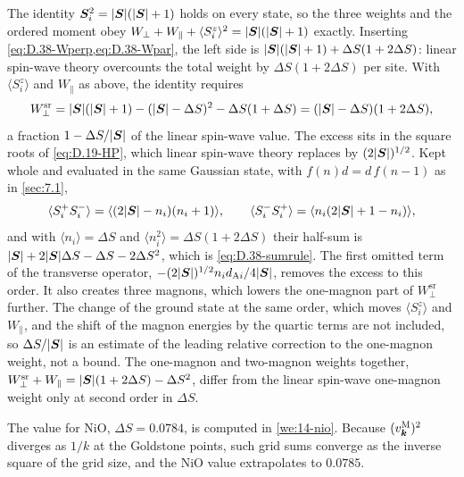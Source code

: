 The identity $\bm{S}_i^2 = |\bm{S}|(|\bm{S}| + 1)$ holds on every state, so the three weights and the ordered moment obey $W_\perp + W_\parallel + \langle S^z_i\rangle^2 = |\bm{S}|(|\bm{S}| + 1)$ exactly. Inserting \cref{eq:D.38-Wperp,eq:D.38-Wpar}, the left side is $|\bm{S}|(|\bm{S}| + 1) + \Delta S(1 + 2\Delta S)$: linear spin-wave theory overcounts the total weight by $\Delta S(1 + 2\Delta S)$ per site. With $\langle S^z_i\rangle$ and $W_\parallel$ as above, the identity requires
\begin{equation}
  W_\perp^{\mathrm{sr}} = |\bm{S}|(|\bm{S}| + 1) - (|\bm{S}| - \Delta S)^2 - \Delta S(1 + \Delta S) = (|\bm{S}| - \Delta S)(1 + 2\Delta S) ,
  \label{eq:D.38-sumrule}
\end{equation}
a fraction $1 - \Delta S/|\bm{S}|$ of the linear spin-wave value. The excess sits in the square roots of \cref{eq:D.19-HP}, which linear spin-wave theory replaces by $(2|\bm{S}|)^{1/2}$. Kept whole and evaluated in the same Gaussian state, with $f(n)d = d\,f(n - 1)$ as in \cref{sec:7.1},
\begin{equation*}
  \langle S^+_iS^-_i\rangle = \langle(2|\bm{S}| - n_i)(n_i + 1)\rangle, \qquad \langle S^-_iS^+_i\rangle = \langle n_i(2|\bm{S}| + 1 - n_i)\rangle ,
\end{equation*}
and with $\langle n_i\rangle = \Delta S$ and $\langle n_i^2\rangle = \Delta S(1 + 2\Delta S)$ their half-sum is $|\bm{S}| + 2|\bm{S}|\Delta S - \Delta S - 2\Delta S^2$, which is \cref{eq:D.38-sumrule}. The first omitted term of the transverse operator, $-(2|\bm{S}|)^{1/2}n_id_{\mathrm{A}i}/4|\bm{S}|$, removes the excess to this order. It also creates three magnons, which lowers the one-magnon part of $W_\perp^{\mathrm{sr}}$ further. The change of the ground state at the same order, which moves $\langle S^z_i\rangle$ and $W_\parallel$, and the shift of the magnon energies by the quartic terms are not included, so $\Delta S/|\bm{S}|$ is an estimate of the leading relative correction to the one-magnon weight, not a bound. The one-magnon and two-magnon weights together, $W_\perp^{\mathrm{sr}} + W_\parallel = |\bm{S}|(1 + 2\Delta S) - \Delta S^2$, differ from the linear spin-wave one-magnon weight only at second order in $\Delta S$.

The value for NiO, $\Delta S = 0.0784$, is computed in \cref{we:14-nio}. Because $(v^{\mathrm{M}}_{\bm{k}})^2$ diverges as $1/k$ at the Goldstone points, such grid sums converge as the inverse square of the grid size, and the NiO value extrapolates to $0.0785$.

